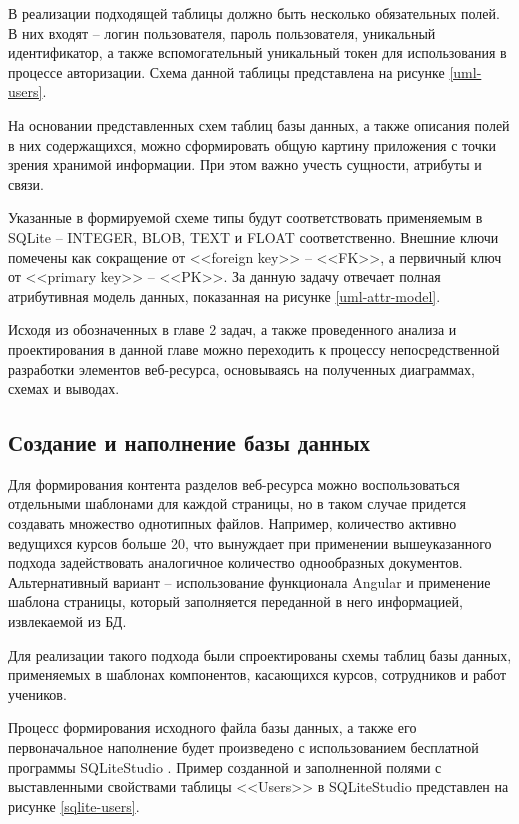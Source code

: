 В реализации подходящей таблицы должно быть несколько обязательных полей.
В них входят -- логин пользователя, пароль пользователя, уникальный идентификатор, а также вспомогательный уникальный токен для использования в процессе авторизации.
Схема данной таблицы представлена на рисунке \ref{uml-users}.

На основании представленных схем таблиц базы данных, а также описания полей в них содержащихся, можно сформировать общую картину приложения с точки зрения хранимой информации.
При этом важно учесть сущности, атрибуты и связи.

Указанные в формируемой схеме типы будут соответствовать применяемым в SQLite -- INTEGER, BLOB, TEXT и FLOAT соответственно.
Внешние ключи помечены как сокращение от <<foreign key>> -- <<FK>>, а первичный ключ от <<primary key>> -- <<PK>>.
За данную задачу отвечает полная атрибутивная модель данных, показанная на рисунке \ref{uml-attr-model}.

Исходя из обозначенных в главе 2 задач, а также проведенного анализа и проектирования в данной главе можно переходить к процессу непосредственной разработки элементов веб-ресурса, основываясь на полученных диаграммах, схемах и выводах.


\subsection{Создание и наполнение базы данных}

Для формирования контента разделов веб-ресурса можно воспользоваться отдельными шаблонами для каждой страницы, но в таком случае придется создавать множество однотипных файлов.
Например, количество активно ведущихся курсов больше 20, что вынуждает при применении вышеуказанного подхода задействовать аналогичное количество однообразных документов.
Альтернативный вариант -- использование функционала Angular и применение шаблона страницы, который заполняется переданной в него информацией, извлекаемой из БД.

Для реализации такого подхода были спроектированы схемы таблиц базы данных, применяемых в шаблонах компонентов, касающихся курсов, сотрудников и работ учеников.

Процесс формирования исходного файла базы данных, а также его первоначальное наполнение будет произведено с использованием бесплатной программы SQLiteStudio \cite{sqlitestudio}.
Пример созданной и заполненной полями с выставленными свойствами таблицы <<Users>> в SQLiteStudio представлен на рисунке \ref{sqlite-users}.

